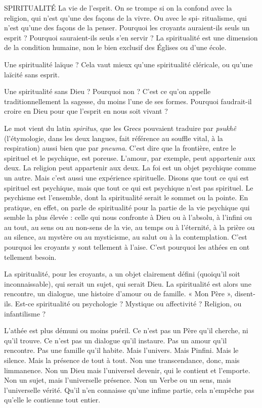 SPIRITUALITÉ La vie de l'esprit. On se trompe si on la confond avec la religion,
qui n’est qu’une des façons de la vivre. Ou avec le spi-
ritualisme, qui n’est qu’une des façons de la penser. Pourquoi les croyants
auraient-ils seuls un esprit ? Pourquoi sauraient-ils seuls s’en servir ? La spiritualité
est une dimension de la condition humaine, non le bien exclusif des
Églises ou d’une école.

Une spiritualité laïque ? Cela vaut mieux qu’une spiritualité cléricale, ou
qu'une laïcité sans esprit.

Une spiritualité sans Dieu ? Pourquoi non ? C’est ce qu’on appelle traditionnellement
la sagesse, du moins l’une de ses formes. Pourquoi faudrait-il
croire en Dieu pour que l'esprit en nous soit vivant ?

Le mot vient du latin {\it spiritus}, que les Grecs pouvaient traduire par {\it psukhê}
(l’étymologie, dans les deux langues, fait référence au souffle vital, à la respiration)
aussi bien que par {\it pneuma}. C’est dire que la frontière, entre le spirituel et
le psychique, est poreuse. L'amour, par exemple, peut appartenir aux deux. La
religion peut appartenir aux deux. La foi est un objet psychique comme un
autre. Mais c’est aussi une expérience spirituelle. Disons que tout ce qui est spirituel
est psychique, mais que tout ce qui est psychique n’est pas spirituel. Le
psychisme est l’ensemble, dont la spiritualité serait le sommet ou la pointe. En
pratique, en effet, on parle de spiritualité pour la partie de la vie psychique qui
semble la plus élevée : celle qui nous confronte à Dieu ou à l’absolu, à l'infini
ou au tout, au sens ou au non-sens de la vie, au temps ou à l'éternité, à la prière
ou au silence, au mystère ou au mysticisme, au salut ou à la contemplation.
C’est pourquoi les croyants y sont tellement à l’aise. C’est pourquoi les athées
en ont tellement besoin.

La spiritualité, pour les croyants, a un objet clairement défini (quoiqu'il
soit inconnaissable), qui serait un sujet, qui serait Dieu. La spiritualité est alors
une rencontre, un dialogue, une histoire d’amour ou de famille. « Mon Père »,
disent-ils. Est-ce spiritualité ou psychologie ? Mystique ou affectivité ? Religion,
ou infantilisme ?

L’athée est plus démuni ou moins puéril. Ce n’est pas un Père qu’il
cherche, ni qu’il trouve. Ce n’est pas un dialogue qu’il instaure. Pas un amour
qu'il rencontre. Pas une famille qu’il habite. Mais l’univers. Mais Pinfini. Mais
le silence. Mais la présence de tout à tout. Non une transcendance, donc, mais
limmanence. Non un Dieu mais l’universel devenir, qui le contient et l’emporte.
Non un sujet, mais l’universelle présence. Non un Verbe ou un sens,
mais l’universelle vérité. Qu'il n’en connaisse qu’une infime partie, cela
n'empêche pas qu’elle le contienne tout entier.

